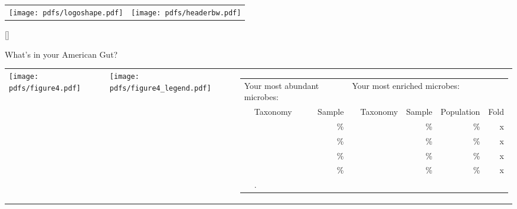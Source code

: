 \documentclass[landscape]{article}
\begin{document}
\begin{tabular}{ @{} m{4.05cm} m{16cm} }
	\texttt{[image: pdfs/logoshape.pdf]} & \texttt{[image: pdfs/headerbw.pdf]} \\
\end{tabular}
	
\vspace{0.65cm}

\begin{center}

\StrLen{\yourname}[\yournameLen]


\end{center}

\vspace{0.65cm}

{\Huge What's in your American Gut?}

\vspace{2mm}

\begin{tabular*}{\textwidth}{ m{2.5in} m{1.3in} m{6.0in} }
    \texttt{[image: pdfs/figure4.pdf]} 
    &
    \texttt{[image: pdfs/figure4\_legend.pdf]}
    &
    {\large 
    \vspace{-6mm}
    \parbox[b][][t]{6in}{
	\begin{tabular}{ c l r c l r r r }
    	    \multicolumn{3}{l}{\Large Your most abundant microbes:} & \multicolumn{5}{l}{\Large Your most enriched microbes:}\\ \addlinespace[2mm]
		\cline{2-3} \cline{5-8} \addlinespace[1mm]
		& Taxonomy & Sample & & Taxonomy & Sample & Population & Fold \\
		\cline{2-3} \cline{5-8} \addlinespace[1mm]
		& \abundTaxonA{} & \abundSamplA{}\% & & \enrichTaxonA{} & \enrichSamplA{}\% & \enrichPopulA{}\% & \enrichFolddA{}x \\
		& \abundTaxonB{} & \abundSamplB{}\% & & \enrichTaxonB{} & \enrichSamplB{}\% & \enrichPopulB{}\% & \enrichFolddB{}x \\
		& \abundTaxonC{} & \abundSamplC{}\% & & \enrichTaxonC{} & \enrichSamplC{}\% & \enrichPopulC{}\% & \enrichFolddC{}x \\
		& \abundTaxonD{} & \abundSamplD{}\% & & \enrichTaxonD{} & \enrichSamplD{}\% & \enrichPopulD{}\% & \enrichFolddD{}x \\
		\cline{2-3} \cline{5-8} \addlinespace[3mm]
		& \multicolumn{7}{p{5.2in}}{\large \rareList{}.}
	\end{tabular}
	}
	}
\end{tabular*}
\end{document}
